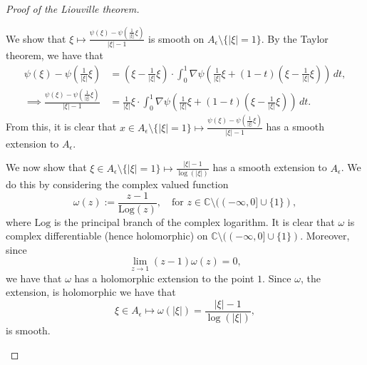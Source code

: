 \documentclass[11pt]{amsart}
\begin{document}
\begin{proof}[Proof of the Liouville theorem]
\begin{enumerate}
 We show that $\xi\mapsto \frac{\psi(\xi)-\psi\left ( \frac{1}{|\xi|}\xi\right)}{|\xi|-1}$ is smooth on $A_{\epsilon} \setminus \{|\xi|=1\}$. By the Taylor theorem, we have that 
	\begin{equation*}
	\begin{split}
		\psi(\xi)-\psi\left ( \frac{1}{|\xi|}\xi\right )&=\left (\xi-\frac{1}{|\xi|}\xi\right )\cdot \int_0^1\nabla \psi \left( \frac{1}{|\xi|}\xi+(1-t)\left (\xi-\frac{1}{|\xi|}\xi\right )\right )\,dt,\\
		\implies \frac{\psi(\xi)-\psi\left ( \frac{1}{|\xi|}\xi\right )}{|\xi|-1}&=\frac{1}{|\xi|}\xi\cdot \int_0^1\nabla \psi \left( \frac{1}{|\xi|}\xi+(1-t)\left (\xi-\frac{1}{|\xi|}\xi\right )\right )\,dt. 
	\end{split}
	\end{equation*} 
	From this, it is clear that $x\in A_{\epsilon}\setminus\{|\xi|=1\}\mapsto \frac{\psi(\xi)-\psi\left ( \frac{1}{|\xi|}\xi\right )}{|\xi|-1}$ 
	has a smooth extension to $A_{\epsilon}$. 

	We now show that $\xi\in A_{\epsilon}\setminus\{|\xi|=1\}\mapsto \frac{|\xi|-1}{\log(|\xi|)}$ has a smooth extension to $A_\epsilon$. We do this by considering the complex valued function 
	\begin{equation*}
		\omega(z):=\frac{z-1}{\text{Log}(z)}, \quad \text{for $z\in \mathbb{C}\setminus ((-\infty,0]\cup\{1\})$},
	\end{equation*}
    where $\text{Log}$ is the principal branch of the complex logarithm.
	It is clear that $\omega$ is complex differentiable (hence holomorphic) on $\mathbb{C}\setminus ((-\infty,0]\cup\{1\})$. Moreover, since 
	\begin{equation*}
		\lim_{z\rightarrow 1}(z-1)\omega(z)=0,
	\end{equation*}
	we have that $\omega$ has a holomorphic extension to the point $1$. Since $\omega$, the extension, is holomorphic we have that 
	\begin{equation*}
		\xi\in A_{\epsilon}\mapsto \omega(|\xi|)=\frac{|\xi|-1}{\log(|\xi|)},
	\end{equation*} 
	is smooth. 


\end{enumerate}
\end{proof}
\end{document}

